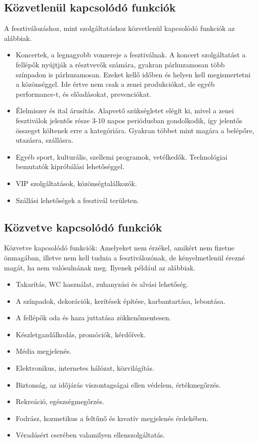 \subsection{Közvetlenül kapcsolódó funkciók}

A fesztiválozáshoz, mint szolgáltatáshoz közvetlenül kapcsolódó funkciók az alábbiak.
\begin{itemize}
\item Koncertek, a legnagyobb vonzereje a fesztiválnak. A koncert szolgáltatást a fellépők nyújtják a résztvevők számára, gyakran párhuzamosan több színpadon is párhuzamosan. Ezeket kellő időben és helyen kell megismertetni a közönséggel. Ide értve nem csak a zenei produkciókat, de egyéb performance-t, és előadásokat, prevenciókat.
\item Élelmiszer és ital árusítás. Alapvető szükségletet elégít ki, mivel a zenei fesztiválok jelentős része 3-10 napos periódusban gondolkodik, így jelentős összeget költenek erre a kategóriára. Gyakran többet mint magára a belépőre, utazásra, szállásra.
\item Egyéb sport, kulturális, szellemi programok, vetélkedők. Technológiai bemutatók kipróbálási lehetőséggel.
\item VIP szolgáltatások, közönségtalálkozók.
\item Szállási lehetőségek a fesztivál területen.
\end{itemize}

\subsection{Közvetve kapcsolódó funkciók}

Közvetve kapcsolódó funkciók: Amelyeket nem érzékel, amikért nem fizetne önmagában, illetve nem kell tudnia a fesztiválozónak, de kényelmetlenül érezné magát, ha nem valósulnának meg. Ilyenek például az alábbiak.
\begin{itemize}
\item Takarítás, WC használat, zuhanyzási és alvási lehetőség.
\item A színpadok, dekorációk, kerítések építése, karbantartása, lebontása.
\item A fellépők oda és haza juttatása zökkenőmentesen.
\item Készletgazdálkodás, promóciók, kérdőívek.
\item Média megjelenés.
\item Elektronikus, internetes hálózat, közvilágítás.
\item Biztonság, az időjárás viszontagságai ellen védelem, értékmegőrzés.
\item Rekreáció, egészségmegőrzés.
\item Fodrász, kozmetikus a feltűnő és kreatív megjelenés érdekében.
\item Véradásért cserében valamilyen ellenszolgáltatás.
\end{itemize}

